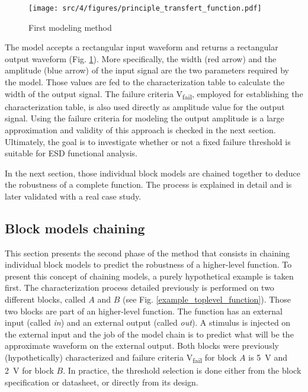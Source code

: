 \begin{figure}[!h]
  \centering
  \texttt{[image: src/4/figures/principle\_transfert\_function.pdf]}
  \caption{First modeling method}
  \label{fig:principle-transfert-func}
\end{figure}

The model accepts a rectangular input waveform and returns a rectangular output waveform (Fig. \ref{fig:principle-transfert-func}).
More specifically, the width (red arrow) and the amplitude (blue arrow) of the input signal are the two parameters required by the model.
Those values are fed to the characterization table to calculate the width of the output signal.
The failure criteria V\textsubscript{fail}, employed for establishing the characterization table, is also used directly as amplitude value for the output signal.
Using the failure criteria for modeling the output amplitude is a large approximation and validity of this approach is checked in the next section.
Ultimately, the goal is to investigate whether or not a fixed failure threshold is suitable for ESD functional analysis.

In the next section, those individual block models are chained together to deduce the robustness of a complete function.
The process is explained in detail and is later validated with a real case study.

\subsection{Block models chaining}
\label{sec:block-chaining}

This section presents the second phase of the method that consists in chaining individual block models to predict the robustness of a higher-level function.
To present this concept of chaining models, a purely hypothetical example is taken first.
The characterization process detailed previously is performed on two different blocks, called $A$ and $B$ (see Fig. \ref{example_toplevel_function}).
Those two blocks are part of an higher-level function.
The function has an external input (called \textit{in}) and an external output (called \textit{out}).
A stimulus is injected on the external input and the job of the model chain is to predict what will be the approximate waveform on the external output.
Both blocks were previously (hypothetically) characterized and failure criteria V\textsubscript{fail} for block $A$ is \SI{5}{\volt} and \SI{2}{\volt} for block $B$.
In practice, the threshold selection is done either from the block specification or datasheet, or directly from its design.

